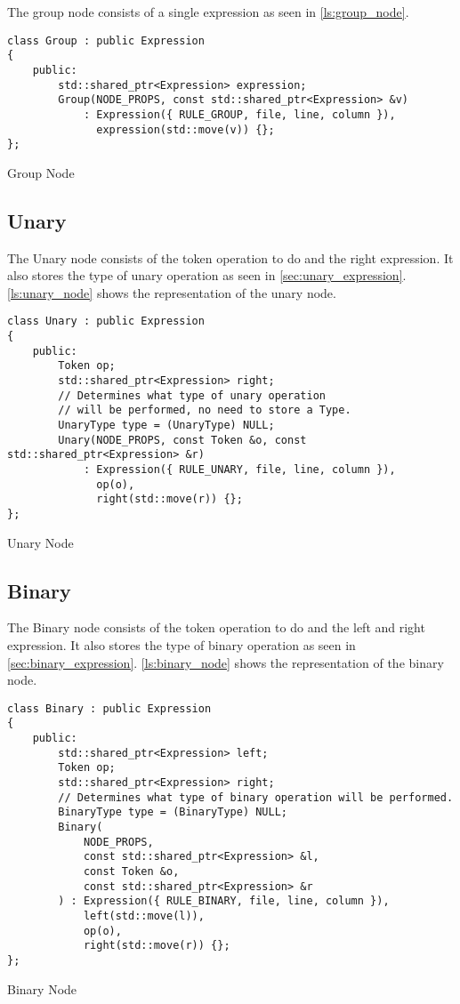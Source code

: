 The group node consists of a single expression as seen in \autoref{ls:group_node}.

\begin{listing}[H]
\begin{verbatim}
class Group : public Expression
{
    public:
        std::shared_ptr<Expression> expression;
        Group(NODE_PROPS, const std::shared_ptr<Expression> &v)
            : Expression({ RULE_GROUP, file, line, column }),
              expression(std::move(v)) {};
};
\end{verbatim}
\caption{Group Node}
\label{ls:group_node}
\end{listing}

\subsection{Unary}

The Unary node consists of the token operation to do and the right expression. It also stores the type of unary operation as seen in
\autoref{sec:unary_expression}. \autoref{ls:unary_node} shows the representation of the unary node.

\begin{listing}[H]
\begin{verbatim}
class Unary : public Expression
{
    public:
        Token op;
        std::shared_ptr<Expression> right;
        // Determines what type of unary operation
        // will be performed, no need to store a Type.
        UnaryType type = (UnaryType) NULL;
        Unary(NODE_PROPS, const Token &o, const std::shared_ptr<Expression> &r)
            : Expression({ RULE_UNARY, file, line, column }),
              op(o),
              right(std::move(r)) {};
};
\end{verbatim}
\caption{Unary Node}
\label{ls:unary_node}
\end{listing}

\subsection{Binary}

The Binary node consists of the token operation to do and the left and right expression. It also stores the type of binary operation as seen in
\autoref{sec:binary_expression}. \autoref{ls:binary_node} shows the representation of the binary node.

\begin{listing}[H]
\begin{verbatim}
class Binary : public Expression
{
    public:
        std::shared_ptr<Expression> left;
        Token op;
        std::shared_ptr<Expression> right;
        // Determines what type of binary operation will be performed.
        BinaryType type = (BinaryType) NULL;
        Binary(
            NODE_PROPS,
            const std::shared_ptr<Expression> &l,
            const Token &o,
            const std::shared_ptr<Expression> &r
        ) : Expression({ RULE_BINARY, file, line, column }),
            left(std::move(l)),
            op(o),
            right(std::move(r)) {};
};
\end{verbatim}
\caption{Binary Node}
\label{ls:binary_node}
\end{listing}

